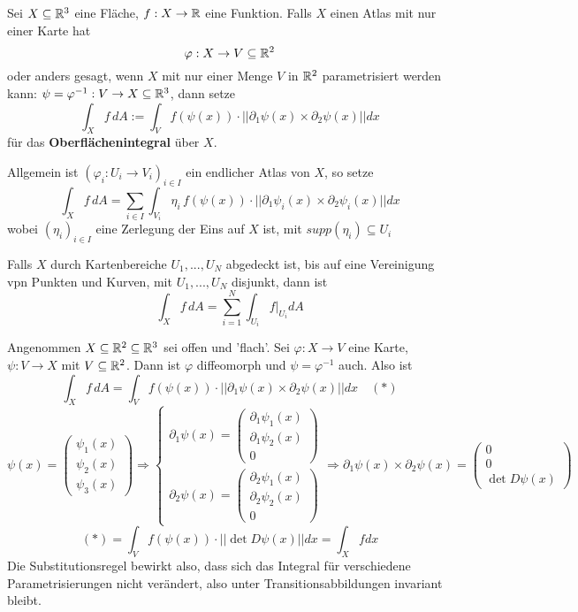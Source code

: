 \documentclass[main.tex]{subfiles}
\begin{document}
\begin{Definition}[Oberflächenintegral]
  Sei $X \subseteq \mathbb{R}^3$ eine Fläche, $f: X \to \mathbb{R}$ eine Funktion. Falls $X$ einen Atlas mit nur einer Karte hat
  $$\varphi: X \to V \subseteq \mathbb{R}^2$$
  oder anders gesagt, wenn $X$ mit nur einer Menge $V$ in $\mathbb{R}^2$ parametrisiert werden kann: $\psi =\varphi^{-1}: V \to X \subseteq \mathbb{R}^3$, dann setze
  $$\int_X f\, dA := \int_V f(\psi(x)) \cdot ||\partial_1 \psi(x) \times \partial_2 \psi(x)|| dx$$
  für das \textbf{Oberflächenintegral} über $X$.

  Allgemein ist $(\varphi_i : U_i \to V_i)_{i \in I}$ ein endlicher Atlas von $X$, so setze
  $$\int_X f \, dA = \sum \limits_{i \in I} \int_{V_i} \eta_i \, f(\psi(x)) \cdot ||\partial_1 \psi_i(x) \times \partial_2 \psi_i(x)||dx$$
  wobei $(\eta_i)_{i \in I}$ eine Zerlegung der Eins auf $X$ ist, mit $supp(\eta_i) \subseteq U_i$
\end{Definition}

\begin{Bemerkung}
  Falls $X$ durch Kartenbereiche $U_1,...,U_N$ abgedeckt ist, bis auf eine Vereinigung vpn Punkten und Kurven, mit $U_1,...,U_N$ disjunkt, dann ist
  $$\int_X f \, dA = \sum \limits_{i = 1}^N \int_{U_i} f|_{U_i} dA$$
\end{Bemerkung}

\begin{Bemerkung}
  Angenommen $X \subseteq \mathbb{R}^2 \subseteq \mathbb{R}^3$ sei offen und 'flach'. Sei $\varphi: X \to V$ eine Karte, $\psi: V \to X$ mit $V \subseteq \mathbb{R}^2$. Dann ist $\varphi$ diffeomorph und $\psi = \varphi^{-1}$ auch.
  Also ist
  $$\int_X f \, dA  = \int_V f(\psi(x)) \cdot ||\partial_1 \psi(x) \times \partial_2 \psi(x)|| dx \quad (*)$$
  $$\psi(x) = \begin{pmatrix}
      \psi_1(x) \\ \psi_2(x) \\ \psi_3(x)
    \end{pmatrix}
    \Rightarrow
    \left\{ \begin{array}{c}
      \partial_1 \psi(x) = \begin{pmatrix}
        \partial_1 \psi_1(x) \\ \partial_1 \psi_2(x) \\ 0
      \end{pmatrix} \\ \partial_2 \psi(x) = \begin{pmatrix}
        \partial_2 \psi_1(x) \\ \partial_2 \psi_2(x) \\ 0
      \end{pmatrix}
    \end{array} \right .
    \Rightarrow
    \partial_1 \psi(x) \times \partial_2 \psi(x) = \begin{pmatrix}
      0 \\ 0 \\ \det D \psi(x)
    \end{pmatrix}$$
    $$(*) = \int_V f(\psi(x)) \cdot ||\det D\psi(x)|| dx = \int_X f dx$$
    Die Substitutionsregel bewirkt also, dass sich das Integral für verschiedene Parametrisierungen nicht verändert, also unter Transitionsabbildungen invariant bleibt.
\end{Bemerkung}
\end{document}
